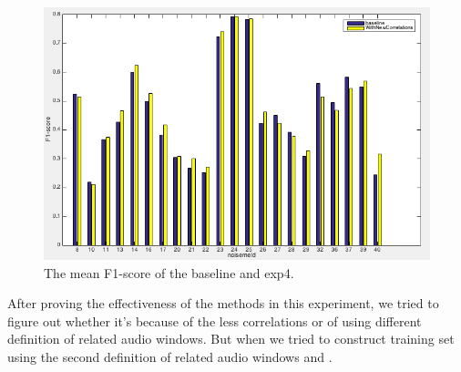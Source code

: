 \documentclass[conference, 11pt, onecolumn]{IEEEtran}
\begin{document}
\begin{figure}[h!]
\centering
\includegraphics[scale=0.45]{figure/newCombined.png}
\caption{The mean F1-score of the baseline and exp4.}
\label{fig:newCombined}
\end{figure}

After proving the effectiveness of the methods in this experiment, we tried to figure out whether it's because of the less correlations or of using different definition of related audio windows. 
But when we tried to construct training set using the second definition of related audio windows and .


\label{section:results}


%
%
\end{document}
